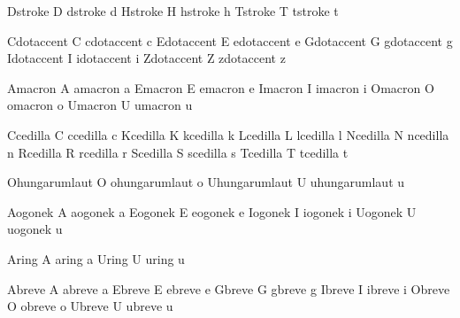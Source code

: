   \inheritprotrudefactor Dstroke D
  \inheritprotrudefactor dstroke d
  \inheritprotrudefactor Hstroke H
  \inheritprotrudefactor hstroke h
  \inheritprotrudefactor Tstroke T
  \inheritprotrudefactor tstroke t
  
  \inheritprotrudefactor Cdotaccent C 
  \inheritprotrudefactor cdotaccent c
  \inheritprotrudefactor Edotaccent E
  \inheritprotrudefactor edotaccent e
  \inheritprotrudefactor Gdotaccent G
  \inheritprotrudefactor gdotaccent g
  \inheritprotrudefactor Idotaccent I
  \inheritprotrudefactor idotaccent i
  \inheritprotrudefactor Zdotaccent Z
  \inheritprotrudefactor zdotaccent z
  
  \inheritprotrudefactor Amacron A
  \inheritprotrudefactor amacron a
  \inheritprotrudefactor Emacron E
  \inheritprotrudefactor emacron e
  \inheritprotrudefactor Imacron I
  \inheritprotrudefactor imacron i
  \inheritprotrudefactor Omacron O
  \inheritprotrudefactor omacron o 
  \inheritprotrudefactor Umacron U
  \inheritprotrudefactor umacron u
  
  \inheritprotrudefactor Ccedilla C
  \inheritprotrudefactor ccedilla c
  \inheritprotrudefactor Kcedilla K
  \inheritprotrudefactor kcedilla k
  \inheritprotrudefactor Lcedilla L
  \inheritprotrudefactor lcedilla l
  \inheritprotrudefactor Ncedilla N
  \inheritprotrudefactor ncedilla n
  \inheritprotrudefactor Rcedilla R
  \inheritprotrudefactor rcedilla r
  \inheritprotrudefactor Scedilla S
  \inheritprotrudefactor scedilla s
  \inheritprotrudefactor Tcedilla T
  \inheritprotrudefactor tcedilla t
  
  \inheritprotrudefactor Ohungarumlaut O
  \inheritprotrudefactor ohungarumlaut o
  \inheritprotrudefactor Uhungarumlaut U
  \inheritprotrudefactor uhungarumlaut u

  \inheritprotrudefactor Aogonek A
  \inheritprotrudefactor aogonek a
  \inheritprotrudefactor Eogonek E
  \inheritprotrudefactor eogonek e
  \inheritprotrudefactor Iogonek I
  \inheritprotrudefactor iogonek i
  \inheritprotrudefactor Uogonek U
  \inheritprotrudefactor uogonek u
  
  \inheritprotrudefactor Aring A
  \inheritprotrudefactor aring a
  \inheritprotrudefactor Uring U
  \inheritprotrudefactor uring u
  
  \inheritprotrudefactor Abreve A
  \inheritprotrudefactor abreve a
  \inheritprotrudefactor Ebreve E
  \inheritprotrudefactor ebreve e
  \inheritprotrudefactor Gbreve G
  \inheritprotrudefactor gbreve g
  \inheritprotrudefactor Ibreve I
  \inheritprotrudefactor ibreve i
  \inheritprotrudefactor Obreve O
  \inheritprotrudefactor obreve o
  \inheritprotrudefactor Ubreve U
  \inheritprotrudefactor ubreve u
  
